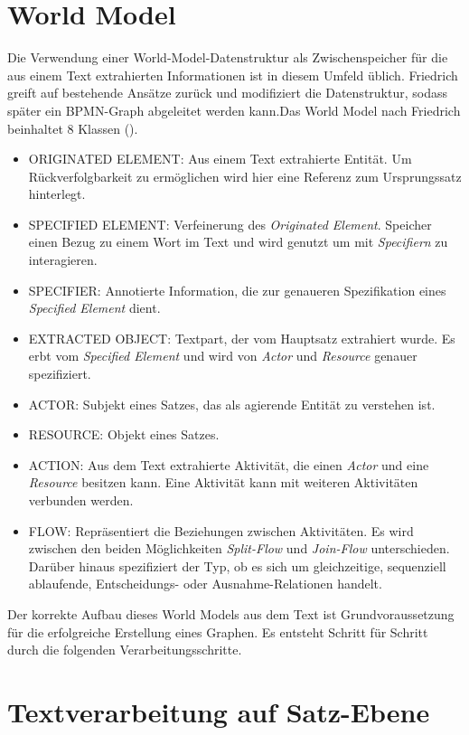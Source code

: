 \section{World Model}
Die Verwendung einer World-Model-Datenstruktur als Zwischenspeicher für die aus einem Text extrahierten Informationen ist in diesem Umfeld üblich. Friedrich greift auf bestehende Ansätze zurück und modifiziert die Datenstruktur, sodass später ein \ac{BPMN}-Graph abgeleitet werden kann.Das World Model nach Friedrich beinhaltet 8 Klassen (\cite[vgl.][46]{FRIEDRICH2}). 
\par
\begin{itemize} 
\item ORIGINATED ELEMENT: Aus einem Text extrahierte Entität. Um Rückverfolgbarkeit zu ermöglichen wird hier eine Referenz zum Ursprungssatz hinterlegt.
\item SPECIFIED ELEMENT: Verfeinerung des \textit{Originated Element}. Speicher einen Bezug zu einem Wort im Text und wird genutzt um mit \textit{Specifiern} zu interagieren.
\item SPECIFIER: Annotierte Information, die zur genaueren Spezifikation eines \textit{Specified Element} dient.
\item EXTRACTED OBJECT: Textpart, der vom Hauptsatz extrahiert wurde. Es erbt vom \textit{Specified Element} und wird  von \textit{Actor} und \textit{Resource} genauer spezifiziert.
\item ACTOR: Subjekt eines Satzes, das als agierende Entität zu verstehen ist. 
\item RESOURCE: Objekt eines Satzes.
\item ACTION: Aus dem Text extrahierte Aktivität, die einen \textit{Actor} und eine \textit{Resource} besitzen kann. Eine Aktivität kann mit weiteren Aktivitäten verbunden werden.
\item FLOW: Repräsentiert die Beziehungen zwischen Aktivitäten. Es wird zwischen den beiden Möglichkeiten \textit{Split-Flow} und \textit{Join-Flow} unterschieden. Darüber hinaus spezifiziert der Typ, ob es sich um gleichzeitige, sequenziell ablaufende, Entscheidungs- oder Ausnahme-Relationen handelt.
\end{itemize}

Der korrekte Aufbau dieses World Models aus dem Text ist Grundvoraussetzung für die erfolgreiche Erstellung eines Graphen. Es entsteht Schritt für Schritt durch die folgenden Verarbeitungsschritte.

\section{Textverarbeitung auf Satz-Ebene}

